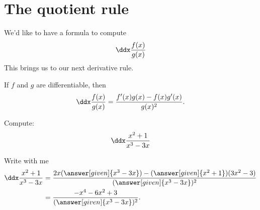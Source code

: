 \documentclass{ximera}
\begin{document}
\section{The quotient rule}


We'd like to have a formula to compute
\[ \ddx \frac{f(x)}{g(x)}\]
 This brings us to our next derivative rule.

\begin{theorem}\label{theorem:quotient-rule}
	If $f$ and $g$ are differentiable, then
	\[ \ddx \frac{f(x)}{g(x)} = \frac{f'(x)g(x)-f(x)g'(x)}{g(x)^2}. \]
\end{theorem}



\begin{example}
	Compute:
	\[ \ddx \frac{x^2+1}{x^3-3x}\]
	
	\begin{explanation}
		Write with me
		\begin{align*}
			\ddx \frac{x^2+1}{x^3-3x} 
				&= \frac{2x(\answer[given]{x^3-3x})-(\answer[given]{x^2+1})(3x^2-3)}{(\answer[given]{x^3-3x})^2}\\
				&=\frac{-x^4-6x^2+3}{(\answer[given]{x^3-3x})^2}.
		\end{align*}
	\end{explanation}
\end{example}
\end{document}
